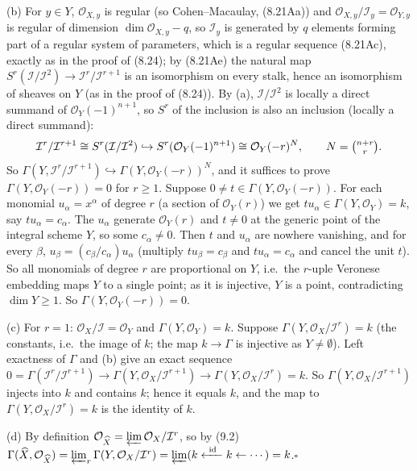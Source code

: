 \documentclass[11pt]{article}
\begin{document}
(b) For $y\in Y$, $\mathcal O_{X,y}$ is regular (so Cohen--Macaulay, (8.21Aa)) and $\mathcal O_{X,y}/\mathcal I_y=\mathcal O_{Y,y}$ is regular of dimension $\dim\mathcal O_{X,y}-q$, so $\mathcal I_y$ is generated by $q$ elements forming part of a regular system of parameters, which is a regular sequence (8.21Ac), exactly as in the proof of (8.24); by (8.21Ae) the natural map $S^r(\mathcal I/\mathcal I^2)\to\mathcal I^r/\mathcal I^{r+1}$ is an isomorphism on every stalk, hence an isomorphism of sheaves on $Y$ (as in the proof of (8.24)). By (a), $\mathcal I/\mathcal I^2$ is locally a direct summand of $\mathcal O_Y(-1)^{n+1}$, so $S^r$ of the inclusion is also an inclusion (locally a direct summand):
\[\mathcal I^r/\mathcal I^{r+1}\cong S^r(\mathcal I/\mathcal I^2)\hookrightarrow S^r(\mathcal O_Y(-1)^{n+1})\cong\mathcal O_Y(-r)^{N},\qquad N=\tbinom{n+r}r.\]
So $\Gamma(Y,\mathcal I^r/\mathcal I^{r+1})\hookrightarrow\Gamma(Y,\mathcal O_Y(-r))^N$, and it suffices to prove $\Gamma(Y,\mathcal O_Y(-r))=0$ for $r\ge1$. Suppose $0\ne t\in\Gamma(Y,\mathcal O_Y(-r))$. For each monomial $u_\alpha=x^\alpha$ of degree $r$ (a section of $\mathcal O_Y(r)$) we get $tu_\alpha\in\Gamma(Y,\mathcal O_Y)=k$, say $tu_\alpha=c_\alpha$. The $u_\alpha$ generate $\mathcal O_Y(r)$ and $t\ne0$ at the generic point of the integral scheme $Y$, so some $c_\alpha\ne0$. Then $t$ and $u_\alpha$ are nowhere vanishing, and for every $\beta$, $u_\beta=(c_\beta/c_\alpha)u_\alpha$ (multiply $tu_\beta=c_\beta$ and $tu_\alpha=c_\alpha$ and cancel the unit $t$). So all monomials of degree $r$ are proportional on $Y$, i.e.\ the $r$-uple Veronese embedding maps $Y$ to a single point; as it is injective, $Y$ is a point, contradicting $\dim Y\ge1$. So $\Gamma(Y,\mathcal O_Y(-r))=0$.

(c) For $r=1$: $\mathcal O_X/\mathcal I=\mathcal O_Y$ and $\Gamma(Y,\mathcal O_Y)=k$. Suppose $\Gamma(Y,\mathcal O_X/\mathcal I^r)=k$ (the constants, i.e.\ the image of $k$; the map $k\to\Gamma$ is injective as $Y\ne\emptyset$). Left exactness of $\Gamma$ and (b) give an exact sequence $0=\Gamma(\mathcal I^r/\mathcal I^{r+1})\to\Gamma(Y,\mathcal O_X/\mathcal I^{r+1})\to\Gamma(Y,\mathcal O_X/\mathcal I^r)=k$. So $\Gamma(Y,\mathcal O_X/\mathcal I^{r+1})$ injects into $k$ and contains $k$; hence it equals $k$, and the map to $\Gamma(Y,\mathcal O_X/\mathcal I^r)=k$ is the identity of $k$.

(d) By definition $\mathcal O_{\widehat X}=\varprojlim\mathcal O_X/\mathcal I^r$, so by (9.2) $\Gamma(\widehat X,\mathcal O_{\widehat X})=\varprojlim_r\Gamma(Y,\mathcal O_X/\mathcal I^r)=\varprojlim(k\xleftarrow{\ \mathrm{id}\ }k\leftarrow\cdots)=k$.\hfill$\square$
\end{document}
